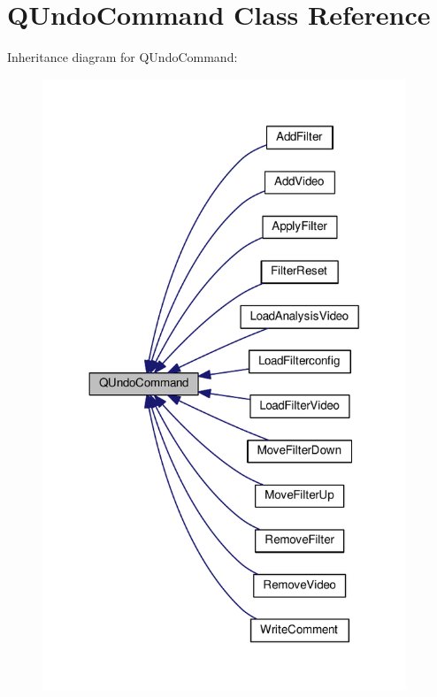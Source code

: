 \hypertarget{classUndoRedo_1_1QUndoCommand}{}\section{Q\+Undo\+Command Class Reference}
\label{classUndoRedo_1_1QUndoCommand}


Inheritance diagram for Q\+Undo\+Command\+:
\nopagebreak
\begin{figure}[H]
\begin{center}
\leavevmode
\includegraphics[width=308pt]{classUndoRedo_1_1QUndoCommand__inherit__graph}
\end{center}
\end{figure}
